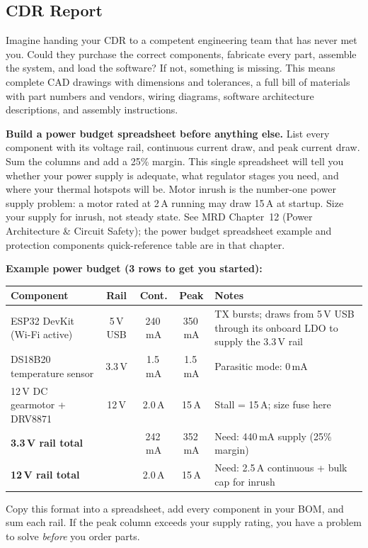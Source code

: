 \subsection{CDR Report}

\begin{faqbox}
Imagine handing your CDR to a competent engineering team that has never met you. Could they purchase the correct components, fabricate every part, assemble the system, and load the software? If not, something is missing. This means complete CAD drawings with dimensions and tolerances, a full bill of materials with part numbers and vendors, wiring diagrams, software architecture descriptions, and assembly instructions.
\end{faqbox}

\begin{protip}
\textbf{Build a power budget spreadsheet before anything else.} List every component with its voltage rail, continuous current draw, and peak current draw. Sum the columns and add a 25\% margin. This single spreadsheet will tell you whether your power supply is adequate, what regulator stages you need, and where your thermal hotspots will be. Motor inrush is the number-one power supply problem: a motor rated at 2\,A running may draw 15\,A at startup. Size your supply for inrush, not steady state. See MRD Chapter~12 (Power Architecture \& Circuit Safety); the power budget spreadsheet example and protection components quick-reference table are in that chapter.

\vspace{4pt}
\textbf{Example power budget (3 rows to get you started):}

\begin{center}\small
\begin{tabularx}{\linewidth}{l c c c X}
\toprule
\textbf{Component} & \textbf{Rail} & \textbf{Cont.} & \textbf{Peak} & \textbf{Notes} \\
\midrule
ESP32 DevKit (Wi-Fi active) & 5\,V USB & 240\,mA & 350\,mA & TX bursts; draws from 5\,V USB through its onboard LDO to supply the 3.3\,V rail \\
DS18B20 temperature sensor & 3.3\,V & 1.5\,mA & 1.5\,mA & Parasitic mode: 0\,mA \\
12\,V DC gearmotor + DRV8871 & 12\,V & 2.0\,A & 15\,A & Stall = 15\,A; size fuse here \\
\midrule
\textbf{3.3\,V rail total} & & 242\,mA & 352\,mA & Need: 440\,mA supply (25\% margin) \\
\textbf{12\,V rail total} & & 2.0\,A & 15\,A & Need: 2.5\,A continuous + bulk cap for inrush \\
\bottomrule
\end{tabularx}
\end{center}
\vspace{2pt}
\noindent Copy this format into a spreadsheet, add every component in your BOM, and sum each rail. If the peak column exceeds your supply rating, you have a problem to solve \textit{before} you order parts.
\end{protip}

